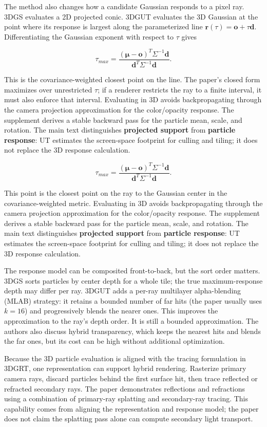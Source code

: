 The method also changes how a candidate Gaussian responds to a pixel ray. 3DGS evaluates a 2D projected conic. 3DGUT evaluates the 3D Gaussian at the point where its response is largest along the parameterized line \(\mathbf{r}(\tau)=\mathbf{o}+\tau\mathbf{d}\). Differentiating the Gaussian exponent with respect to \(\tau\) gives

\[\tau_{max}=\frac{(\boldsymbol\mu-\mathbf{o})^T\Sigma^{-1}\mathbf{d}}{\mathbf{d}^T\Sigma^{-1}\mathbf{d}}.\]

This is the covariance-weighted closest point on the line. The paper's closed form maximizes over unrestricted \(\tau\); if a renderer restricts the ray to a finite interval, it must also enforce that interval. Evaluating in 3D avoids backpropagating through the camera projection approximation for the color/opacity response. The supplement derives a stable backward pass for the particle mean, scale, and rotation. The main text distinguishes \textbf{projected support} from \textbf{particle response}: UT estimates the screen-space footprint for culling and tiling; it does not replace the 3D response calculation.

\[\tau_{max}=\frac{(\boldsymbol\mu-\mathbf{o})^T\Sigma^{-1}\mathbf{d}}{\mathbf{d}^T\Sigma^{-1}\mathbf{d}}.\]

This point is the closest point on the ray to the Gaussian center in the covariance-weighted metric. Evaluating in 3D avoids backpropagating through the camera projection approximation for the color/opacity response. The supplement derives a stable backward pass for the particle mean, scale, and rotation. The main text distinguishes \textbf{projected support} from \textbf{particle response}: UT estimates the screen-space footprint for culling and tiling; it does not replace the 3D response calculation.

The response model can be composited front-to-back, but the sort order matters. 3DGS sorts particles by center depth for a whole tile; the true maximum-response depth may differ per ray. 3DGUT adds a per-ray multilayer alpha-blending (MLAB) strategy: it retains a bounded number of far hits (the paper usually uses \(k=16\)) and progressively blends the nearer ones. This improves the approximation to the ray's depth order. It is still a bounded approximation. The authors also discuss hybrid transparency, which keeps the nearest hits and blends the far ones, but its cost can be high without additional optimization.

Because the 3D particle evaluation is aligned with the tracing formulation in 3DGRT, one representation can support hybrid rendering. Rasterize primary camera rays, discard particles behind the first surface hit, then trace reflected or refracted secondary rays. The paper demonstrates reflections and refractions using a combination of primary-ray splatting and secondary-ray tracing. This capability comes from aligning the representation and response model; the paper does not claim the splatting pass alone can compute secondary light transport.

